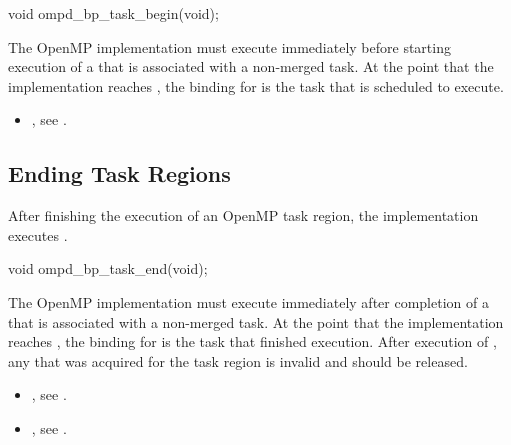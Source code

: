 \format
\begin{cspecific}
\begin{ompSyntax}
void ompd_bp_task_begin(void);
\end{ompSyntax}
\end{cspecific}

\descr
The OpenMP implementation must execute  
immediately before starting execution of a  that is
associated with a non-merged task. At the point that the implementation 
reaches , the binding for 
 is the task that is scheduled to execute.

\crossreferences
\begin{itemize}
\item {}, 
see .
\end{itemize}



\subsection{Ending Task Regions}
\label{subsubsec:ompd_bp_task_end}

\summary
After finishing the execution of an OpenMP task region, 
the implementation executes .

\format
\begin{cspecific}
\begin{ompSyntax}
void ompd_bp_task_end(void);
\end{ompSyntax}
\end{cspecific}

\descr
The OpenMP implementation must execute  immediately
after completion of a  that is associated with a 
non-merged task. At the point that the implementation reaches 
, the binding for  
is the task that finished execution. After execution of , 
any  that was acquired for the task region is invalid and 
should be released.

\crossreferences
\begin{itemize}
\item {}, 
see .

\item {}, see .
\end{itemize}



